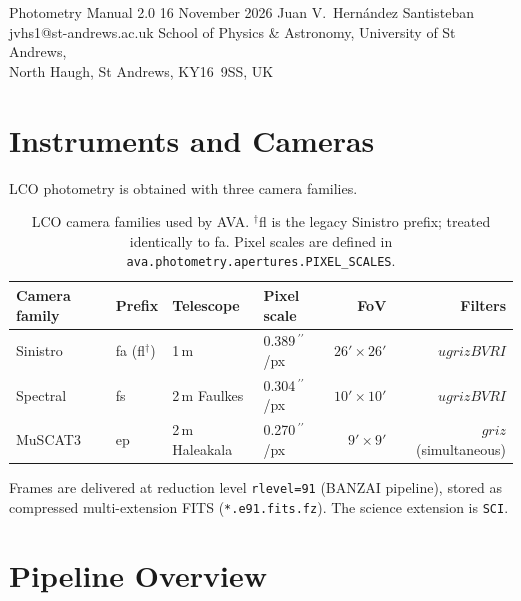\documentclass[12pt,a4paper]{article}
\begin{document}

\avatitlepage
  {Photometry Manual}
  {2.0}
  {16 November 2026}
  {Juan V.\ Hern\'{a}ndez Santisteban}
  {jvhs1@st-andrews.ac.uk}
  {School of Physics \& Astronomy, University of St Andrews,\\
   North Haugh, St Andrews, KY16~9SS, UK}

\tableofcontents
\clearpage

\section{Instruments and Cameras}
\label{sec:instruments}

LCO photometry is obtained with three camera families.

\begin{table}[h!]
\centering
\small
\begin{tabular}{llllrr}
\toprule
Camera family & Prefix & Telescope & Pixel scale & FoV & Filters \\
\midrule
Sinistro & fa (fl$^\dagger$) & 1\,m & 0.389\,\ensuremath{^{\prime\prime}}/px & $26'\times26'$ & $ugrizBVRI$ \\
Spectral & fs & 2\,m Faulkes & 0.304\,\ensuremath{^{\prime\prime}}/px & $10'\times10'$ & $ugrizBVRI$ \\
MuSCAT3  & ep & 2\,m Haleakala & 0.270\,\ensuremath{^{\prime\prime}}/px & $9'\times9'$ & $griz$ (simultaneous) \\
\bottomrule
\end{tabular}
\caption{LCO camera families used by AVA.
  $^\dagger$fl is the legacy Sinistro prefix; treated identically to fa.
  Pixel scales are defined in \texttt{ava.photometry.apertures.PIXEL\_\hspace{0pt}SCALES}.}
\label{tab:cameras}
\end{table}

Frames are delivered at reduction level \texttt{rlevel=91} (BANZAI pipeline),
stored as compressed multi-extension FITS (\texttt{*.e91.fits.fz}).  The
science extension is \texttt{SCI}.

\section{Pipeline Overview}
\label{sec:overview-phot}
\end{document}
